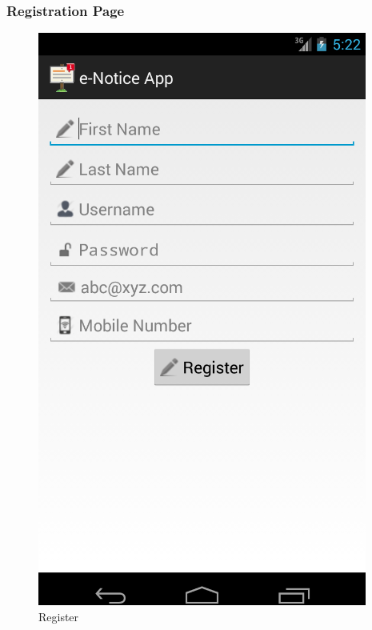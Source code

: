 \documentclass{beamer}   %
\begin{document}
\begin{frame}
\frametitle{Registration Page}
\begin{figure}
\includegraphics[scale=0.2]{image/register.png}
\caption{Register}
\end{figure}
\end{frame}
\end{document}
